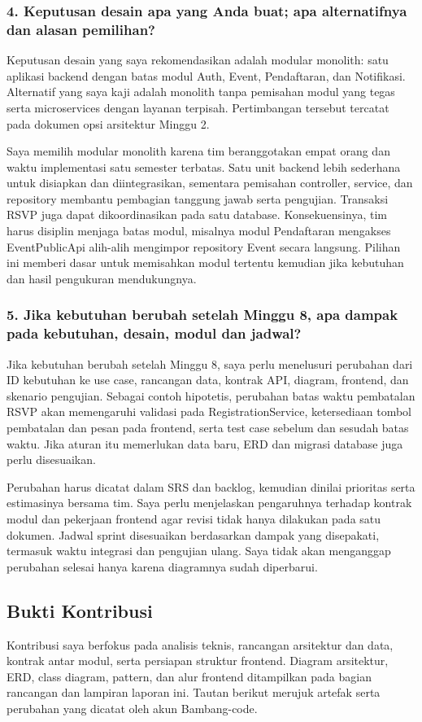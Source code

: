 \documentclass[11pt,a4paper]{article}
\begin{document}
\subsubsection*{4. Keputusan desain apa yang Anda buat; apa alternatifnya dan alasan pemilihan?}
Keputusan desain yang saya rekomendasikan adalah modular monolith: satu aplikasi backend dengan batas modul Auth, Event, Pendaftaran, dan Notifikasi. Alternatif yang saya kaji adalah monolith tanpa pemisahan modul yang tegas serta microservices dengan layanan terpisah. Pertimbangan tersebut tercatat pada dokumen opsi arsitektur Minggu 2.

Saya memilih modular monolith karena tim beranggotakan empat orang dan waktu implementasi satu semester terbatas. Satu unit backend lebih sederhana untuk disiapkan dan diintegrasikan, sementara pemisahan controller, service, dan repository membantu pembagian tanggung jawab serta pengujian. Transaksi RSVP juga dapat dikoordinasikan pada satu database. Konsekuensinya, tim harus disiplin menjaga batas modul, misalnya modul Pendaftaran mengakses EventPublicApi alih-alih mengimpor repository Event secara langsung. Pilihan ini memberi dasar untuk memisahkan modul tertentu kemudian jika kebutuhan dan hasil pengukuran mendukungnya.

\subsubsection*{5. Jika kebutuhan berubah setelah Minggu 8, apa dampak pada kebutuhan, desain, modul dan jadwal?}
Jika kebutuhan berubah setelah Minggu 8, saya perlu menelusuri perubahan dari ID kebutuhan ke use case, rancangan data, kontrak API, diagram, frontend, dan skenario pengujian. Sebagai contoh hipotetis, perubahan batas waktu pembatalan RSVP akan memengaruhi validasi pada RegistrationService, ketersediaan tombol pembatalan dan pesan pada frontend, serta test case sebelum dan sesudah batas waktu. Jika aturan itu memerlukan data baru, ERD dan migrasi database juga perlu disesuaikan.

Perubahan harus dicatat dalam SRS dan backlog, kemudian dinilai prioritas serta estimasinya bersama tim. Saya perlu menjelaskan pengaruhnya terhadap kontrak modul dan pekerjaan frontend agar revisi tidak hanya dilakukan pada satu dokumen. Jadwal sprint disesuaikan berdasarkan dampak yang disepakati, termasuk waktu integrasi dan pengujian ulang. Saya tidak akan menganggap perubahan selesai hanya karena diagramnya sudah diperbarui.

\subsection*{Bukti Kontribusi}
Kontribusi saya berfokus pada analisis teknis, rancangan arsitektur dan data, kontrak antar modul, serta persiapan struktur frontend. Diagram arsitektur, ERD, class diagram, pattern, dan alur frontend ditampilkan pada bagian rancangan dan lampiran laporan ini. Tautan berikut merujuk artefak serta perubahan yang dicatat oleh akun Bambang-code.
\end{document}
